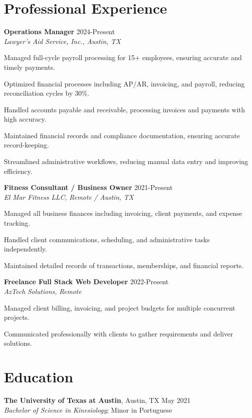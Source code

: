 \documentclass[letterpaper,10pt]{article}
\newcommand{\resumeItem}[1]{\item \small{#1}}
\begin{document}
\section*{Professional Experience}
\begin{compactitem}
  \item[]
    \textbf{Operations Manager} \hfill 2024-Present \\
    \textit{Lawyer's Aid Service, Inc., Austin, TX}
    \begin{compactitem}
      \resumeItem{Managed full-cycle payroll processing for 15+ employees, ensuring accurate and timely payments.}
      \resumeItem{Optimized financial processes including AP/AR, invoicing, and payroll, reducing reconciliation cycles by 30\%.}
      \resumeItem{Handled accounts payable and receivable, processing invoices and payments with high accuracy.}
      \resumeItem{Maintained financial records and compliance documentation, ensuring accurate record-keeping.}
      \resumeItem{Streamlined administrative workflows, reducing manual data entry and improving efficiency.}
    \end{compactitem}

  \item[]
    \textbf{Fitness Consultant / Business Owner} \hfill 2021-Present \\
    \textit{El Mar Fitness LLC, Remote / Austin, TX}
    \begin{compactitem}
      \resumeItem{Managed all business finances including invoicing, client payments, and expense tracking.}
      \resumeItem{Handled client communications, scheduling, and administrative tasks independently.}
      \resumeItem{Maintained detailed records of transactions, memberships, and financial reports.}
    \end{compactitem}

  \item[]
    \textbf{Freelance Full Stack Web Developer} \hfill 2022-Present \\
    \textit{AzTech Solutions, Remote}
    \begin{compactitem}
      \resumeItem{Managed client billing, invoicing, and project budgets for multiple concurrent projects.}
      \resumeItem{Communicated professionally with clients to gather requirements and deliver solutions.}
    \end{compactitem}
\end{compactitem}

\section*{Education}
\begin{compactitem}
  \item[]
    \textbf{The University of Texas at Austin}, Austin, TX \hfill May 2021 \\
    \textit{Bachelor of Science in Kinesiology}; Minor in Portuguese
\end{compactitem}
\end{document}
